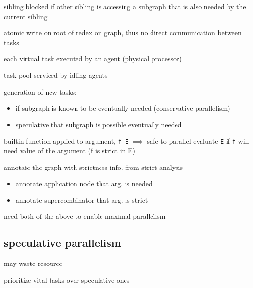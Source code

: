 \documentclass[8pt]{extarticle}
\begin{document}
\begin{multicols*}{2}
\begin{itemize}
  sibling blocked if other sibling is accessing a subgraph that is also needed by the current sibling

  atomic write on root of redex on graph, thus no direct communication between tasks

  each virtual task executed by an agent (physical processor)

  task pool serviced by idling agents
\end{itemize}

generation of new tasks:
\begin{itemize}
\item if subgraph is known to be eventually needed (conservative parallelism)
\item speculative that subgraph is possible eventually needed
\end{itemize}

builtin function applied to argument, \verb|f E|
$\implies$ safe to parallel evaluate \verb|E| if \verb|f| will need value of the argument (f is strict in E)

annotate the graph with strictness info. from strict analysis
\begin{itemize}
\item annotate application node that arg. is needed


\item annotate supercombinator that arg. is strict

  
\end{itemize}

need both of the above to enable maximal parallelism

\subsection{speculative parallelism}
may waste resource

prioritize vital tasks over speculative ones


\end{multicols*}
\end{document}
